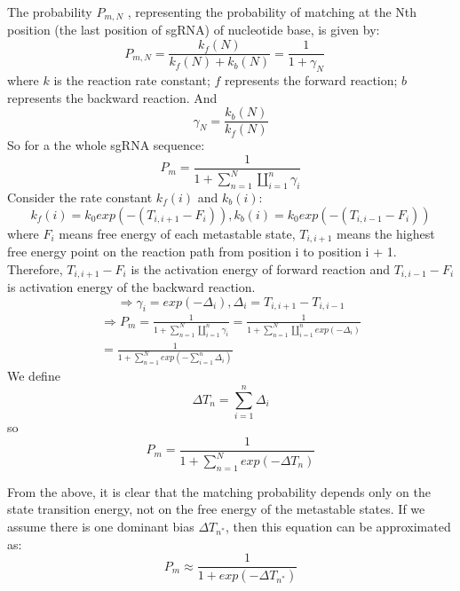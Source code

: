 The probability $P_{m,N}$ , representing the probability of matching at the Nth position (the last position of sgRNA) of nucleotide base, is given by:
\begin{equation}
P_{m,N}=\frac{k_f(N)}{k_f(N)+k_b(N)}=\frac{1}{1+\gamma_N} \quad
\end{equation}
where $k$ is the reaction rate constant; $f$ represents the forward reaction; $b$ represents the backward reaction. And 
\begin{equation}
 \gamma_N=\frac{k_b(N)}{k_f(N)}
\end{equation}
So for a the whole sgRNA sequence: 
\begin{equation}
P_{m} = \frac{1}{1+\sum_{n=1}^N\coprod_{i=1}^n \gamma_i}
\end{equation}
Consider the rate constant $k_f(i)$ and $k_b(i)$:
\begin{equation}
k_f(i)=k_0exp(-(T_{i,i+1}-F_i)),k_b(i)=k_0exp(-(T_{i,i-1}-F_i))
\end{equation}
where $F_i$ means free energy of each metastable state, $T_{i,i+1}$ means the highest free energy point on the reaction path from position i to position i + 1. Therefore, $T_{i,i+1}-F_i$ is the activation energy of forward reaction and $T_{i,i-1}-F_i$ is activation energy of the backward reaction.
\begin{equation}
\Rightarrow \gamma_i=exp(-\Delta_i), \Delta_i=T_{i,i+1}-T_{i,i-1}
\end{equation}
\begin{equation}
\begin{aligned}
\Rightarrow P_{m} = \frac{1}{1+\sum_{n=1}^N\coprod_{i=1}^n \gamma_i}=\frac{1}{1+\sum_{n=1}^N\coprod_{i=1}^n exp(-\Delta_i)}\\=\frac{1}{1+\sum_{n=1}^N exp(-\sum_{i=1}^n\Delta_i)}
\end{aligned}
\end{equation}
We define $$\Delta T_n=\sum_{i=1}^n\Delta_i$$
so
\begin{equation} 
P_{m} =\frac{1}{1+\sum_{n=1}^N exp(-\Delta T_n)}
\end{equation}
	
From the above, it is clear that the matching probability depends only on the state transition energy, not on the free energy of the metastable states. If we assume there is one dominant bias $\Delta T_{n^*}$, then this equation can be approximated as:
\begin{equation}
 P_{m} \approx \frac{1}{1+exp(-\Delta T_{n^*})}
\end{equation}

